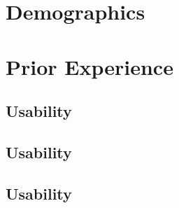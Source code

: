 \documentclass[12pt,pdftex,a4paper]{scrartcl}
\begin{document}
	
	
	\begin{Form}
		\section*{Demographics}
		
		\section*{Prior Experience}
		
	\end{Form}
	
	
	\newpage
	\renewcommand{\headerQuestionairePart}{Questionaire's Subtitle}
	\begin{Form}
		\section*{Usability}
		
	\end{Form}
	
	\newpage
	\renewcommand{\headerQuestionairePart}{Questionaire's Subtitle (Part 2)}
	\begin{Form}
		\section*{Usability}
		
	\end{Form}

	\newpage
	\renewcommand{\headerQuestionairePart}{Questionaire's Subtitle, the final one}
	\begin{Form}
		\section*{Usability}
		
	\end{Form}
	
\end{document}
